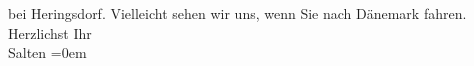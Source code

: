 \begin{ledgroupsized}[t]{13cm}
               bei Heringsdorf. Vielleicht sehen wir uns, wenn
               Sie nach Dänemark fahren.\pend
           \pstart
           Herzlichst Ihr {\\[\baselineskip]}\spacefill\mbox{Salten}\pend
           \leftskip=0em{}
         
         \endnumbering{}\end{ledgroupsized}\begin{anhang}\end{anhang}\newcommand{\dateiname}{L03427}\newcommand{\titel}{Felix Salten an Arthur Schnitzler, 19. 6. 1906}\newcommand{\editorInnen}{Martin Anton Müller und Laura Untner}
      